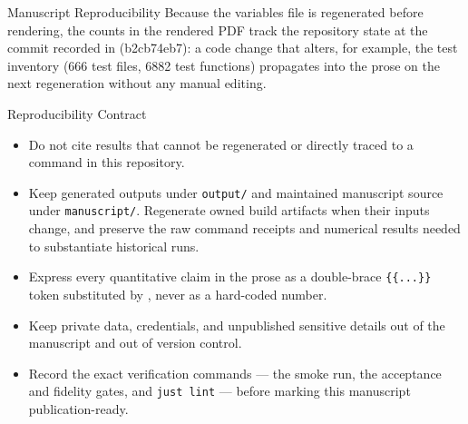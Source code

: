 \documentclass[
  ignorenonframetext,
]{beamer}
\providecommand{\tightlist}{%
  \setlength{\itemsep}{0pt}\setlength{\parskip}{0pt}}
\begin{document}
\begin{frame}{Manuscript Reproducibility}
Because the variables file is regenerated before rendering, the counts
in the rendered PDF track the repository state at the commit recorded in
 (b2cb74eb7): a code
change that alters, for example, the test inventory (666 test files,
6882 test functions) propagates into the prose on the next regeneration
without any manual editing.
\end{frame}

\begin{frame}{Reproducibility Contract}
\protect{}\label{reproducibility-contract}
\begin{itemize}
\tightlist
\item
  Do not cite results that cannot be regenerated or directly traced to a
  command in this repository.
\item
  Keep generated outputs under \texttt{output/} and maintained
  manuscript source under \texttt{manuscript/}. Regenerate owned build
  artifacts when their inputs change, and preserve the raw command
  receipts and numerical results needed to substantiate historical runs.
\item
  Express every quantitative claim in the prose as a double-brace
  \texttt{\{\{...\}\}} token substituted by
  , never as a
  hard-coded number.
\item
  Keep private data, credentials, and unpublished sensitive details out
  of the manuscript and out of version control.
\item
  Record the exact verification commands --- the smoke run, the
  acceptance and fidelity gates, and \texttt{just\ lint} --- before
  marking this manuscript publication-ready.
\end{itemize}
\end{frame}
\end{document}
